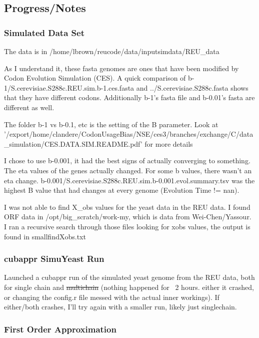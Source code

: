 \subsection{Progress/Notes}

\subsubsection{Simulated Data Set}
The data is in /home/lbrown/reucode/data/inputsimdata/REU\_data

As I understand it, these fasta genomes are ones that have been modified by Codon Evolution Simulation (CES). A quick comparison of  b-1/S.cerevisiae.S288c.REU.sim.b-1.ces.fasta and ../S.cerevisiae.S288c.fasta shows that they have different codons. Additionally b-1's fasta file and b-0.01's fasta are different as well.

The folder b-1 vs b-0.1, etc is the setting of the B parameter. Look at '/export/home/clandere/CodonUsageBias/NSE/ces3/branches/exchange/C/data\_simulation/CES.DATA.SIM.README.pdf' for more details

I chose to use b-0.001, it had the best signs of actually converging to something. The eta values of the genes actually changed. For some b values, there wasn't an eta change. b-0.001/S.cerevisiae.S288c.REU.sim.b-0.001.evol.summary.tsv was the highest B value that had changes at every genome (Evolution Time != nan). 

I was not able to find X\_obs values for the yeast data in the REU data. I found ORF data in /opt/big\_scratch/work-my, which is data from Wei-Chen/Yassour. I ran a recursive search through those files looking for xobs values, the output is found in smallfindXobs.txt



\subsubsection{cubappr SimuYeast Run}
Launched a cubappr run of the simulated yeast genome from the REU data, both for single chain and \sout{multichain} (nothing happened for ~2 hours. either it crashed, or changing the config.r file messed with the actual inner workings). If either/both crashes, I'll try again with a smaller run, likely just singlechain.


\subsubsection{First Order Approximation}

